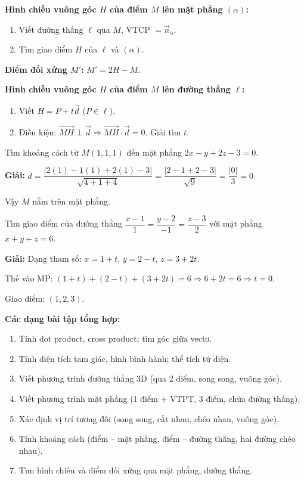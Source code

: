 \documentclass[12pt,a4paper]{article}
\begin{document}
\begin{phuongphap}[title={Hình chiếu và đối xứng}]
  \textbf{Hình chiếu vuông góc $H$ của điểm $M$ lên mặt phẳng $(\alpha)$:}
  \begin{enumerate}
    \item Viết đường thẳng $\ell$ qua $M$, VTCP $= \vec{n}_\alpha$.
    \item Tìm giao điểm $H$ của $\ell$ và $(\alpha)$.
  \end{enumerate}
  \textbf{Điểm đối xứng $M'$:} $M' = 2H - M$.

  \textbf{Hình chiếu vuông góc $H$ của điểm $M$ lên đường thẳng $\ell$:}
  \begin{enumerate}
    \item Viết $H = P + t\vec{d}$ ($P \in \ell$).
    \item Điều kiện: $\overrightarrow{MH} \perp \vec{d} \Rightarrow \overrightarrow{MH}\cdot\vec{d} = 0$. Giải tìm $t$.
  \end{enumerate}
\end{phuongphap}

\begin{vidu}
  Tìm khoảng cách từ $M(1,1,1)$ đến mặt phẳng $2x - y + 2z - 3 = 0$.

  \medskip\textbf{Giải:}
  $d = \dfrac{|2(1)-1(1)+2(1)-3|}{\sqrt{4+1+4}} = \dfrac{|2-1+2-3|}{\sqrt{9}} = \dfrac{|0|}{3} = 0$.

  Vậy $M$ nằm trên mặt phẳng.
\end{vidu}

\begin{vidu}
  Tìm giao điểm của đường thẳng $\dfrac{x-1}{1}=\dfrac{y-2}{-1}=\dfrac{z-3}{2}$ với mặt phẳng $x+y+z=6$.

  \medskip\textbf{Giải:}
  Dạng tham số: $x=1+t$, $y=2-t$, $z=3+2t$.

  Thế vào MP: $(1+t)+(2-t)+(3+2t)=6 \Rightarrow 6+2t=6 \Rightarrow t=0$.

  Giao điểm: $(1,2,3)$.
\end{vidu}

\medskip\noindent\textbf{Các dạng bài tập tổng hợp:}
\begin{enumerate}[label=\textbf{Dạng \arabic*:}, leftmargin=*, align=left]
  \item Tính dot product, cross product; tìm góc giữa vectơ.
  \item Tính diện tích tam giác, hình bình hành; thể tích tứ diện.
  \item Viết phương trình đường thẳng 3D (qua 2 điểm, song song, vuông góc).
  \item Viết phương trình mặt phẳng (1 điểm + VTPT, 3 điểm, chứa đường thẳng).
  \item Xác định vị trí tương đối (song song, cắt nhau, chéo nhau, vuông góc).
  \item Tính khoảng cách (điểm -- mặt phẳng, điểm -- đường thẳng, hai đường chéo nhau).
  \item Tìm hình chiếu và điểm đối xứng qua mặt phẳng, đường thẳng.
\end{enumerate}
\end{document}
